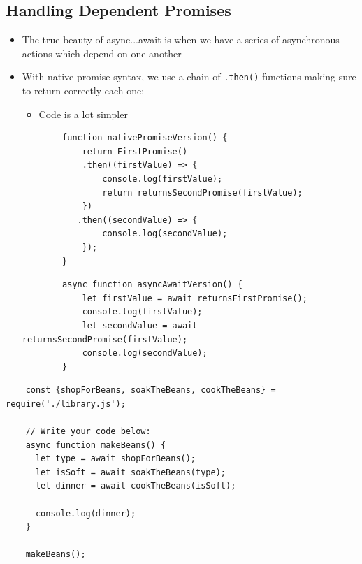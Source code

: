 \documentclass[12pt]{article}
\begin{document}
\subsection{Handling Dependent Promises}
\begin{itemize}
    \item The true beauty of async...await is when we have a series of asynchronous actions which depend on one another
    \item With native promise syntax, we use a chain of \texttt{.then()} functions
    making sure to return correctly each one:
    \begin{itemize}
        \item Code is a lot simpler
    \end{itemize}

    \begin{lstlisting}
        function nativePromiseVersion() {
            return FirstPromise()
            .then((firstValue) => {
                console.log(firstValue);
                return returnsSecondPromise(firstValue);
            })
           .then((secondValue) => {
                console.log(secondValue);
            });
        }
    \end{lstlisting}

    \begin{lstlisting}
        async function asyncAwaitVersion() {
            let firstValue = await returnsFirstPromise();
            console.log(firstValue);
            let secondValue = await returnsSecondPromise(firstValue);
            console.log(secondValue);
        }
    \end{lstlisting}
\end{itemize}

\begin{lstlisting}
    const {shopForBeans, soakTheBeans, cookTheBeans} = require('./library.js');

    // Write your code below:
    async function makeBeans() {
      let type = await shopForBeans();
      let isSoft = await soakTheBeans(type);
      let dinner = await cookTheBeans(isSoft);

      console.log(dinner);
    }

    makeBeans();
\end{lstlisting}
\end{document}
